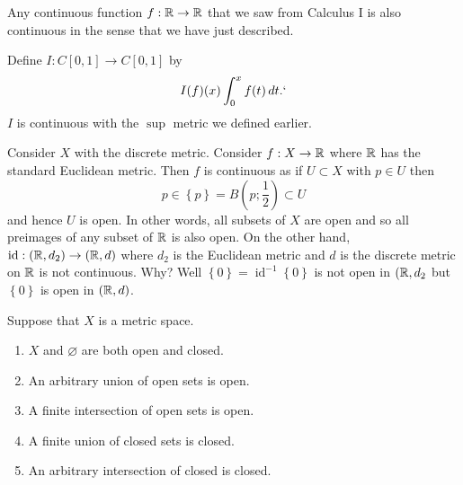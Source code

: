 

\begin{example}[]
	Any continuous function $f: \mathbb{R} \to \mathbb{R}$ that we saw from Calculus I is also
	continuous in the sense that we have just described.
\end{example}

\begin{example}[]
	Define $I: C[0,1] \to C[0,1]$ by
	\[
		I(f)(x) \int_0^x f(t) \,dt.`
	\]
	$I$ is continuous with the $\sup$ metric we defined earlier.
\end{example}

\begin{example}[]
	Consider $X$ with the discrete metric.
	Consider $f: X \to \mathbb{R}$ where $\mathbb{R}$ has the standard Euclidean metric.
	Then $f$ is continuous as if $U \subset X$ with $p \in U$ then
	\[
		p \in \left\{ p \right\} 
		= B\left(p; \frac12\right) \subset U
	\]
	and hence $U$ is open. 
	In other words, all subsets of $X$ are open and so all preimages of any
	subset of $\mathbb{R}$ is also open.
	On the other hand, $\operatorname{id}: (\mathbb{R}, d_2) \to (\mathbb{R}, d)$ where $d_2$ is
	the Euclidean metric and $d$ is the discrete metric on $\mathbb{R}$ is not
	continuous. 
	Why? Well 
	$\left\{ 0 \right\} = \operatorname{id}^{-1}{\left\{ 0 \right\}}$ 
	is not open in 
	$(\mathbb{R}, d_2$ but $\left\{ 0 \right\}$ is open in $(\mathbb{R}, d)$.
\end{example}

\begin{lemma}[]
	Suppose that $X$ is a metric space.
	\begin{enumerate}
		\item $X$ and $\varnothing$ are both open and closed.
		\item An arbitrary union of open sets is open.
		\item A finite intersection of open sets is open.
		\item A finite union of closed sets is closed.
		\item An arbitrary intersection of closed is closed.
	\end{enumerate}
\end{lemma}


